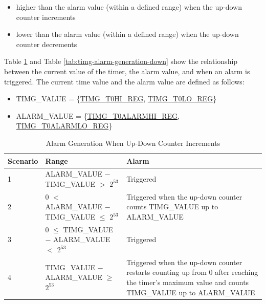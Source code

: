 \documentclass[main\_\_EN.tex]{subfiles}
\begin{document}
\begin{itemize}
    \item higher than the alarm value (within a defined range) when the up-down counter increments
    \item lower than the alarm value (within a defined range) when the up-down counter decrements
\end{itemize}

Table \ref{tab:timg-alarm-generation-up} and Table \ref{tab:timg-alarm-generation-down} show the relationship between the current value of the timer, the alarm value, and when an alarm is triggered. The current time value and the alarm value are defined as follows:

\begin{itemize}
    \item TIMG\_VALUE = \{\hyperref[regdesc:TIMGTXHIREG]{TIMG\_T0HI\_REG}, \hyperref[regdesc:TIMGTXLOREG]{TIMG\_T0LO\_REG}\}
    \item ALARM\_VALUE = \{\hyperref[regdesc:TIMGTXALARMHIREG]{TIMG\_T0ALARMHI\_REG}, \hyperref[regdesc:TIMGTXALARMLOREG]{TIMG\_T0ALARMLO\_REG}\}
\end{itemize}

\begin{table}[H]
\centering
\caption{Alarm Generation When Up-Down Counter Increments}
\label{tab:timg-alarm-generation-up}

\begin{tabular}{|l|l|m{7cm}|}
\hline
\rowcolor{lightgray}
    \textbf{Scenario} & \textbf{Range} & \textbf{Alarm} \\\hline
     1 & ALARM\_VALUE $-$ TIMG\_VALUE $>$ $2^{53}$ & Triggered \\\hline
     2 & 0 $<$ ALARM\_VALUE $-$ TIMG\_VALUE $\leq$ $2^{53}$ & Triggered when the up-down counter counts TIMG\_VALUE up to ALARM\_VALUE \\\hline
     3 & 0 $\leq$ TIMG\_VALUE $-$ ALARM\_VALUE $<$ $2^{53}$ & Triggered \\\hline
     4 & TIMG\_VALUE $-$ ALARM\_VALUE $\geq$ $2^{53}$ & Triggered when the up-down counter restarts counting up from 0 after reaching the timer's maximum value and counts TIMG\_VALUE up to ALARM\_VALUE \\\hline
\end{tabular}
\end{table}
\end{document}
